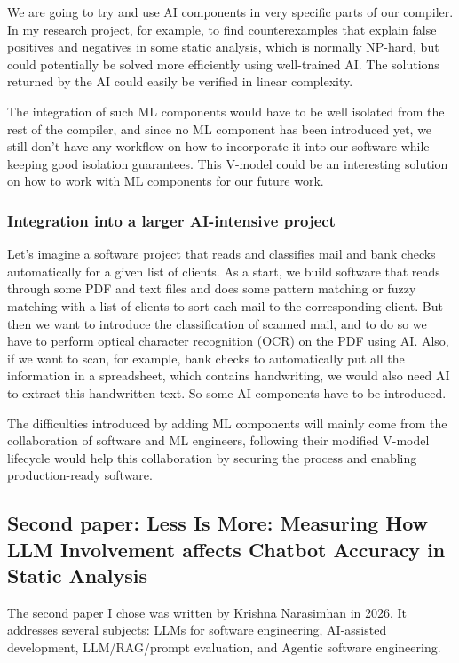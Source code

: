 \documentclass[11pt]{article}
\begin{document}
We are going to try and use AI components in very specific parts of our
compiler. In my research project, for example, to find counterexamples that
explain false positives and negatives in some static analysis, which is normally
NP-hard, but could potentially be solved more efficiently using well-trained
AI. The solutions returned by the AI could easily be verified in linear
complexity.

The integration of such ML components would have to be well isolated from the
rest of the compiler, and since no ML component has been introduced yet, we
still don't have any workflow on how to incorporate it into our software while
keeping good isolation guarantees. This V-model could be an interesting solution
on how to work with ML components for our future work.
\subsubsection{Integration into a larger AI-intensive project}
\label{sec:orgf78ca7f}
Let's imagine a software project that reads and classifies mail and bank checks
automatically for a given list of clients. As a start, we build software that
reads through some PDF and text files and does some pattern matching or fuzzy
matching with a list of clients to sort each mail to the corresponding
client. But then we want to introduce the classification of scanned mail, and to
do so we have to perform optical character recognition (OCR) on the PDF using
AI. Also, if we want to scan, for example, bank checks to automatically put all
the information in a spreadsheet, which contains handwriting, we would also need
AI to extract this handwritten text. So some AI components have to be
introduced.

The difficulties introduced by adding ML components will mainly come from the
collaboration of software and ML engineers, following their modified V-model
lifecycle would help this collaboration by securing the process and enabling
production-ready software.
\subsection{Second paper: Less Is More: Measuring How LLM Involvement affects Chatbot Accuracy in Static Analysis}
\label{sec:org2090275}
The second paper I chose was written by Krishna Narasimhan in 2026. It addresses
several subjects: LLMs for software engineering, AI-assisted development,
LLM/RAG/prompt evaluation, and Agentic software engineering.
\end{document}
